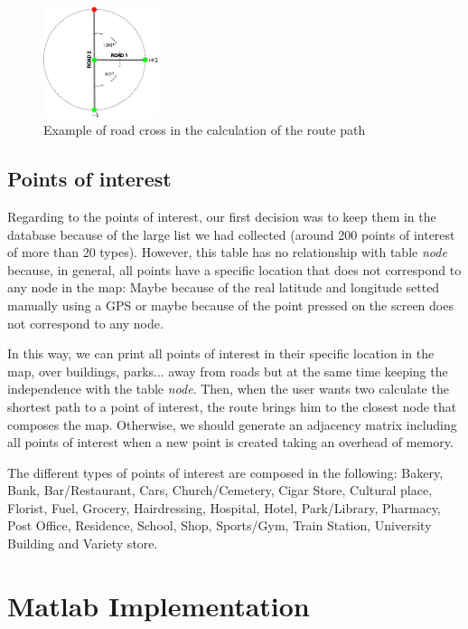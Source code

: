 \documentclass{article}
\begin{document}
\begin{figure}[h]
\centering
\includegraphics[width=0.3\textwidth]{angle.png}
\caption{Example of road cross in the calculation of the route path}
\end{figure}

\clearpage
\subsection{Points of interest}
Regarding to the points of interest, our first decision was to keep them in the database because of the large list we had collected (around 200 points of interest of more than 20 types). However, this table has no relationship with table \textit{node} because, in general, all points have a specific location that does not correspond to any node in the map: Maybe because of the real latitude and longitude setted manually using a GPS or maybe because of the point pressed on the screen does not correspond to any node.

In this way, we can print all points of interest in their specific location in the map, over buildings, parks... away from roads but at the same time keeping the independence with the table \textit{node}. Then, when the user wants two calculate the shortest path to a point of interest, the route brings him to the closest node that composes the map. Otherwise, we should generate an adjacency matrix including all points of interest when a new point is created taking an overhead of memory.

The different types of points of interest are composed in the following: Bakery, Bank, Bar/Restaurant, Cars, Church/Cemetery, Cigar Store, Cultural place, Florist, Fuel, Grocery, Hairdressing, Hospital, Hotel, Park/Library, Pharmacy, Post Office, Residence, School, Shop, Sports/Gym, Train Station, University Building and Variety store.

\clearpage
\section{Matlab Implementation}
       
\end{document}
